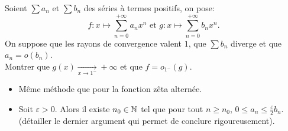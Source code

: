 Soient $\sum a_n$ et $\sum b_n$ des séries à termes positifs, on pose:
$$f:x \mapsto \sum_{n=0}^{+\infty} a_n x^n \text{ et } g:x \mapsto \sum_{n=0}^{+\infty} b_n x^n.$$
On suppose que les rayons de convergence valent $1$, que $\sum b_n$ diverge et que $a_n = o(b_n)$.\\
Montrer que $g(x) \xrightarrow[x \to 1^-]{} + \infty$ et que $f = o_{1^-}(g)$.

\begin{itemize}
    \item Même méthode que pour la fonction zêta alternée.
    \item Soit $\varepsilon > 0$. Alors il existe $n_0 \in \mathbb{N}$ tel que pour tout $n \geqslant n_0$, $0 \leqslant a_n \leqslant \frac{\varepsilon}{2} b_n$. (détailler le dernier argument qui permet de conclure rigoureusement).
\end{itemize}